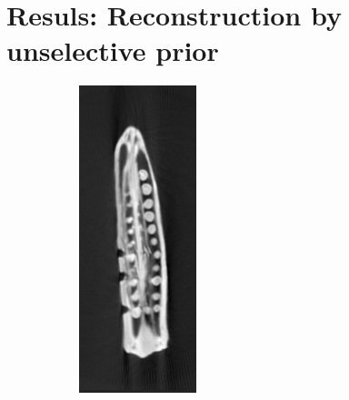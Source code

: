 \documentclass[journal]{IEEEtran}
\begin{document}
 \section{Resuls: Reconstruction by unselective prior}
\begin{figure}[!h]
    \begin{subfigure}[b]{0.18\linewidth}
        \includegraphics[width=\textwidth]{../images/okra/templateCropped_1.png}

\end{subfigure}
\end{figure}
\end{document}
